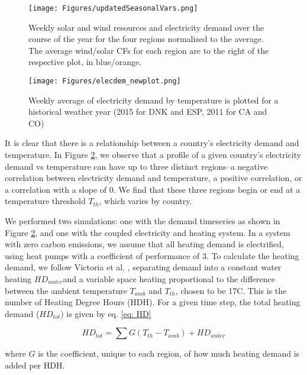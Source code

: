 \documentclass[lettersize,journal]{IEEEtran}
\begin{document}
\begin{figure}[H]
\centering
\texttt{[image: Figures/updatedSeasonalVars.png]}
\caption{Weekly solar and wind resources and electricity demand over the course of the year for the four regions normalized to the average. The average wind/solar CFs for each region are to the right of the respective plot, in blue/orange.} 
\label{fig: ED_CF_all} 
\end{figure}



\begin{figure}[H]
\centering
\texttt{[image: Figures/elecdem\_newplot.png]}
\caption{Weekly average of electricity demand by temperature is plotted for a historical weather year (2015 for DNK and ESP, 2011 for CA and CO)} 
\label{fig: electempall} 
\end{figure}


It is clear that there is a relationship between a country's electricity demand and temperature. In Figure \ref{fig: electempall}, we observe that a profile of a given country's electricity demand vs temperature can have up to three distinct regions--a negative correlation between electricity demand and temperature, a positive correlation, or a correlation with a slope of 0. We find that these three regions begin or end at a temperature threshold $T_{th}$, which varies by country.



We performed two simulations: one with the demand timeseries as shown in Figure \ref{fig: electempall}, and one with the coupled electricity and heating system. In a system with zero carbon emissions, we assume that all heating demand is electrified, using heat pumps with a coefficient of performance of 3. To calculate the heating demand, we follow Victoria et al. \cite{victoria_storage_2019}, separating demand into a constant water heating $HD_{water}$and a variable space heating proportional to the difference between the ambient temperature $T_{amb}$ and $T_{th}$, chosen to be 17\degree C. This is the number of Heating Degree Hours (HDH). For a given time step, the total heating demand ($HD_{tot}$) is given by eq. \ref{eq: HD}

\begin{equation}
    HD_{tot} = \sum G (T_{th} - T_{amb}) + HD_{water}
    \label{eq: HD}
\end{equation}

where $G$ is the coefficient, unique to each region, of how much heating demand is added per HDH. 
\end{document}
